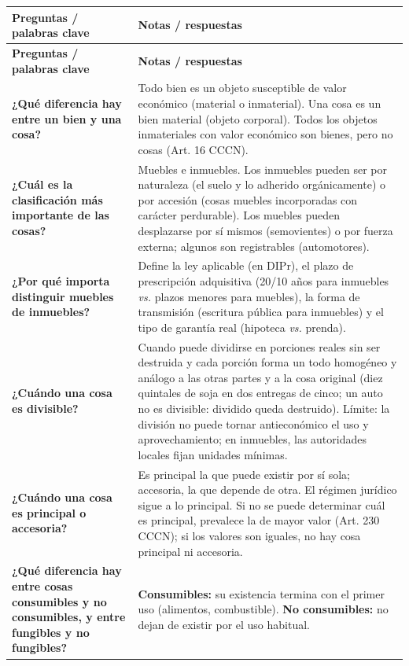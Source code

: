 \documentclass[12pt,oneside]{book}
\newcommand{\cornellinicio}{\begingroup\small\renewcommand{\arraystretch}{1.4}}
\newcommand{\cornellpregunta}[2]{\textbf{#1} & #2 \\ \hline}
\begin{document}
\cornellinicio
\begin{longtable}{|Q|Z|}
\hline
{}\textbf{Preguntas / palabras clave} & \textbf{Notas / respuestas} \\ \hline
\endfirsthead
\hline
{}\textbf{Preguntas / palabras clave} & \textbf{Notas / respuestas} \\ \hline
\endhead

\cornellpregunta{¿Qué diferencia hay entre un bien y una cosa?}{%
Todo bien es un objeto susceptible de valor económico (material o inmaterial). Una cosa es un bien material (objeto corporal). Todos los objetos inmateriales con valor económico son bienes, pero no cosas (Art. 16 CCCN).}

\cornellpregunta{¿Cuál es la clasificación más importante de las cosas?}{%
Muebles e inmuebles. Los inmuebles pueden ser por naturaleza (el suelo y lo adherido orgánicamente) o por accesión (cosas muebles incorporadas con carácter perdurable). Los muebles pueden desplazarse por sí mismos (semovientes) o por fuerza externa; algunos son registrables (automotores).}

\cornellpregunta{¿Por qué importa distinguir muebles de inmuebles?}{%
Define la ley aplicable (en DIPr), el plazo de prescripción adquisitiva (20/10 años para inmuebles \textit{vs.} plazos menores para muebles), la forma de transmisión (escritura pública para inmuebles) y el tipo de garantía real (hipoteca \textit{vs.} prenda).}

\cornellpregunta{¿Cuándo una cosa es divisible?}{%
Cuando puede dividirse en porciones reales sin ser destruida y cada porción forma un todo homogéneo y análogo a las otras partes y a la cosa original (diez quintales de soja en dos entregas de cinco; un auto no es divisible: dividido queda destruido). Límite: la división no puede tornar antieconómico el uso y aprovechamiento; en inmuebles, las autoridades locales fijan unidades mínimas.}

\cornellpregunta{¿Cuándo una cosa es principal o accesoria?}{%
Es principal la que puede existir por sí sola; accesoria, la que depende de otra. El régimen jurídico sigue a lo principal. Si no se puede determinar cuál es principal, prevalece la de mayor valor (Art. 230 CCCN); si los valores son iguales, no hay cosa principal ni accesoria.}

\cornellpregunta{¿Qué diferencia hay entre cosas consumibles y no consumibles, y entre fungibles y no fungibles?}{%
\textbf{Consumibles:} su existencia termina con el primer uso (alimentos, combustible). \textbf{No consumibles:} no dejan de existir por el uso habitual.

}
\end{longtable}
\end{document}
